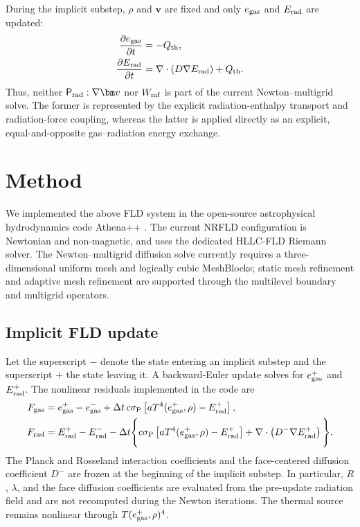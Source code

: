 During the implicit substep, $\rho$ and $\bm v$ are fixed and only
$e_{\rm gas}$ and $E_{\rm rad}$ are updated:
\begin{align}
    \frac{\partial e_{\rm gas}}{\partial t}
    &=-Q_{\rm th},
    \label{eq:implicit_gas_energy}\\
    \frac{\partial E_{\rm rad}}{\partial t}
    &=\nabla\cdot(D\nabla E_{\rm rad})+Q_{\rm th}.
    \label{eq:implicit_radiation_energy}
\end{align}
Thus, neither ${\sf P}_{\rm rad}:\nabla\bm v$ nor $W_{\rm mf}$ is part of the
current Newton--multigrid solve.  The former is represented by the explicit
radiation-enthalpy transport and radiation-force coupling, whereas the latter
is applied directly as an explicit, equal-and-opposite gas--radiation energy
exchange.


\section{Method}
\label{sec:method}

We implemented the above FLD system in the open-source astrophysical
hydrodynamics code Athena++ \citep{Stone2020-np}.  The current NRFLD
configuration is Newtonian and non-magnetic, and uses the dedicated HLLC-FLD
Riemann solver.  The Newton--multigrid diffusion solve currently requires a
three-dimensional uniform mesh and logically cubic MeshBlocks; static mesh
refinement and adaptive mesh refinement are supported through the multilevel
boundary and multigrid operators.

\subsection{Implicit FLD update}
\label{sec:method_overview}

Let the superscript $-$ denote the state entering an implicit substep and the
superscript $+$ the state leaving it.  A backward-Euler update solves for
$e_{\rm gas}^{+}$ and $E_{\rm rad}^{+}$.  The nonlinear residuals implemented
in the code are
\begin{align}
    F_{\rm gas}
    &=e_{\rm gas}^{+}-e_{\rm gas}^{-}
      +\Delta t\,c\sigma_{\rm P}
       \left[aT^4(e_{\rm gas}^{+},\rho)-E_{\rm rad}^{+}\right],
    \label{eq:Fgas_residual}\\
    F_{\rm rad}
    &=E_{\rm rad}^{+}-E_{\rm rad}^{-}
      -\Delta t\Bigg\{
       c\sigma_{\rm P}
       \left[aT^4(e_{\rm gas}^{+},\rho)-E_{\rm rad}^{+}\right]
       +\nabla\cdot\left(D^{-}\nabla E_{\rm rad}^{+}\right)
       \Bigg\}.
    \label{eq:Frad_residual}
\end{align}
The Planck and Rosseland interaction coefficients and the face-centered
diffusion coefficient $D^{-}$ are frozen at the beginning of the implicit
substep.  In particular, $R$, $\lambda$, and the face diffusion coefficients
are evaluated from the pre-update radiation field and are not recomputed
during the Newton iterations.  The thermal source remains nonlinear through
$T(e_{\rm gas}^{+},\rho)^4$.

